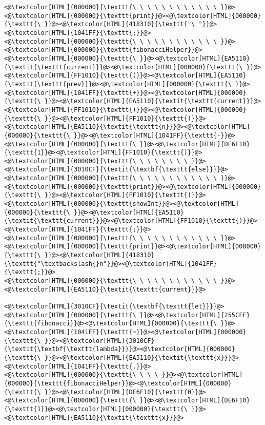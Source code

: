 \begin{lstlisting}
<@\textcolor[HTML]{000000}{\texttt{\ \ \ \ \ \ \ \ \ \ \ \ }}@><@\textcolor[HTML]{000000}{\texttt{print}}@><@\textcolor[HTML]{000000}{\texttt{\ }}@><@\textcolor[HTML]{418310}{\texttt{"\ "}}@><@\textcolor[HTML]{1041FF}{\texttt{;}}@>
<@\textcolor[HTML]{000000}{\texttt{\ \ \ \ \ \ \ \ \ \ \ \ }}@><@\textcolor[HTML]{000000}{\texttt{fibonacciHelper}}@><@\textcolor[HTML]{000000}{\texttt{\ }}@><@\textcolor[HTML]{EA5110}{\textit{\texttt{current}}}@><@\textcolor[HTML]{000000}{\texttt{\ }}@><@\textcolor[HTML]{FF1010}{\texttt{(}}@><@\textcolor[HTML]{EA5110}{\textit{\texttt{prev}}}@><@\textcolor[HTML]{000000}{\texttt{\ }}@><@\textcolor[HTML]{1041FF}{\texttt{+}}@><@\textcolor[HTML]{000000}{\texttt{\ }}@><@\textcolor[HTML]{EA5110}{\textit{\texttt{current}}}@><@\textcolor[HTML]{FF1010}{\texttt{)}}@><@\textcolor[HTML]{000000}{\texttt{\ }}@><@\textcolor[HTML]{FF1010}{\texttt{(}}@><@\textcolor[HTML]{EA5110}{\textit{\texttt{n}}}@><@\textcolor[HTML]{000000}{\texttt{\ }}@><@\textcolor[HTML]{1041FF}{\texttt{-}}@><@\textcolor[HTML]{000000}{\texttt{\ }}@><@\textcolor[HTML]{DE6F10}{\texttt{1}}@><@\textcolor[HTML]{FF1010}{\texttt{)}}@>
<@\textcolor[HTML]{000000}{\texttt{\ \ \ \ \ \ \ \ }}@><@\textcolor[HTML]{3010CF}{\textit{\textbf{\texttt{else}}}}@>
<@\textcolor[HTML]{000000}{\texttt{\ \ \ \ \ \ \ \ \ \ \ \ }}@><@\textcolor[HTML]{000000}{\texttt{print}}@><@\textcolor[HTML]{000000}{\texttt{\ }}@><@\textcolor[HTML]{FF1010}{\texttt{(}}@><@\textcolor[HTML]{000000}{\texttt{showInt}}@><@\textcolor[HTML]{000000}{\texttt{\ }}@><@\textcolor[HTML]{EA5110}{\textit{\texttt{current}}}@><@\textcolor[HTML]{FF1010}{\texttt{)}}@><@\textcolor[HTML]{1041FF}{\texttt{;}}@>
<@\textcolor[HTML]{000000}{\texttt{\ \ \ \ \ \ \ \ \ \ \ \ }}@><@\textcolor[HTML]{000000}{\texttt{print}}@><@\textcolor[HTML]{000000}{\texttt{\ }}@><@\textcolor[HTML]{418310}{\texttt{"\textbackslash{}n"}}@><@\textcolor[HTML]{1041FF}{\texttt{;}}@>
<@\textcolor[HTML]{000000}{\texttt{\ \ \ \ \ \ \ \ \ \ \ \ }}@><@\textcolor[HTML]{EA5110}{\textit{\texttt{current}}}@>

<@\textcolor[HTML]{3010CF}{\textit{\textbf{\texttt{let}}}}@><@\textcolor[HTML]{000000}{\texttt{\ }}@><@\textcolor[HTML]{255CFF}{\texttt{fibonacci}}@><@\textcolor[HTML]{000000}{\texttt{\ }}@><@\textcolor[HTML]{1041FF}{\texttt{=}}@><@\textcolor[HTML]{000000}{\texttt{\ }}@><@\textcolor[HTML]{3010CF}{\textit{\textbf{\texttt{lambda}}}}@><@\textcolor[HTML]{000000}{\texttt{\ }}@><@\textcolor[HTML]{EA5110}{\textit{\texttt{x}}}@><@\textcolor[HTML]{1041FF}{\texttt{.}}@>
<@\textcolor[HTML]{000000}{\texttt{\ \ \ \ }}@><@\textcolor[HTML]{000000}{\texttt{fibonacciHelper}}@><@\textcolor[HTML]{000000}{\texttt{\ }}@><@\textcolor[HTML]{DE6F10}{\texttt{0}}@><@\textcolor[HTML]{000000}{\texttt{\ }}@><@\textcolor[HTML]{DE6F10}{\texttt{1}}@><@\textcolor[HTML]{000000}{\texttt{\ }}@><@\textcolor[HTML]{EA5110}{\textit{\texttt{x}}}@>


\end{lstlisting}
